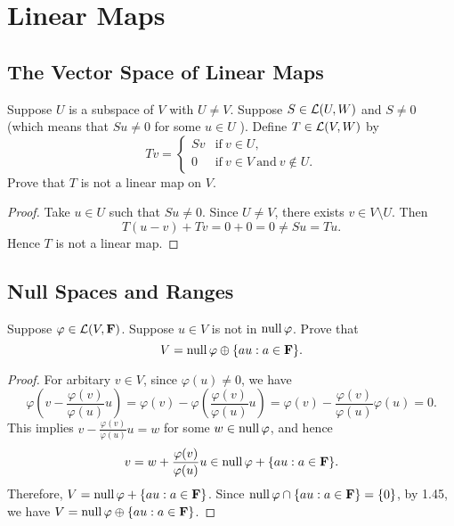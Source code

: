 \chapter{Linear Maps}

\section{The Vector Space of Linear Maps}

\begin{exercise}{10}
	Suppose \( U \) is a subspace of \( V \) with \( U \neq V \). Suppose \( S \in \operatorname{\mathcal{L}}(U, W) \) and \( S \neq 0 \) (which means that \( Su \neq 0 \) for some \( u \in U \) ). Define \( T \in \operatorname{\mathcal{L}}(V, W) \) by
	\[
		Tv = \begin{cases}
			Sv & \text{if} \ v \in U, \\
			0  & \text{if} \ v \in V \ \text{and} \ v \not\in U.
		\end{cases}
	\]
Prove that \( T \) is not a linear map on \( V \).
\end{exercise}

\begin{proof}
	Take \( u \in U \) such that \( Su \neq 0 \). Since \( U \neq V \), there exists \( v \in V \setminus U \). Then
	\[
		T(u - v) + Tv = 0 + 0 = 0 \neq Su = Tu.
	\]
	Hence \( T \) is not a linear map.
\end{proof}

\section{Null Spaces and Ranges}

\begin{exercise}{29}
	Suppose \( \varphi \in \operatorname{\mathcal{L}}(V, \mathbf{F}) \). Suppose \( u \in V \) is not in \( \operatorname{null}{\varphi} \). Prove that
	\[
		V = \operatorname{null}{\varphi} \oplus \{au : a \in \mathbf{F}\}.
	\]
\end{exercise}

\begin{proof}
	For arbitary \( v \in V \), since \( \varphi(u) \neq 0 \), we have
	\[
		\varphi\left(v - \frac{\varphi(v)}{\varphi(u)}u\right) = \varphi(v) - \varphi\left(\frac{\varphi(v)}{\varphi(u)}u\right) = \varphi(v) - \frac{\varphi(v)}{\varphi(u)}\varphi(u) = 0.
	\]
	This implies \( v - \frac{\varphi(v)}{\varphi(u)}u = w \) for some \( w \in \operatorname{null}{\varphi} \), and hence
	\[
		v = w + \frac{\varphi(v)}{\varphi(u)}u \in \operatorname{null}{\varphi} + \{au : a \in \mathbf{F}\}.
	\]
	Therefore, \( V = \operatorname{null}{\varphi} + \{au : a \in \mathbf{F}\} \). Since \( \operatorname{null}{\varphi} \cap \{au : a \in \mathbf{F}\} = \{0\} \), by 1.45, we have \( V = \operatorname{null}{\varphi} \oplus \{au : a \in \mathbf{F}\} \).
\end{proof}

